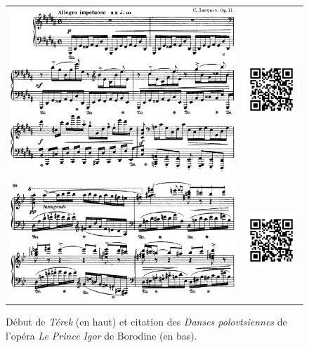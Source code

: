 \begin{figure}[!p]
  \begin{bigcenter}
    \begin{tabular}{lr}
      \vspace*{0.0cm}
      \includegraphics[width=12.5cm, keepaspectratio]{op-11-iv-1.png}
      &
      \includegraphics[width=3cm, keepaspectratio]{op-11-iv-qr.png}
      \\
      \vspace{0.5cm} &
      \\
      \includegraphics[width=12.5cm, keepaspectratio]{op-11-iv-2.png}
      &
      \includegraphics[width=3cm, keepaspectratio]{op-11-iv-qr.png}
    \end{tabular}
  \end{bigcenter}
  \caption{\label{op11-iv}Début de \emph{Térek} (en haut) et citation des \emph{Danses polovtsiennes} de l'opéra \emph{Le Prince Igor} de Borodine (en bas).}
\end{figure}

